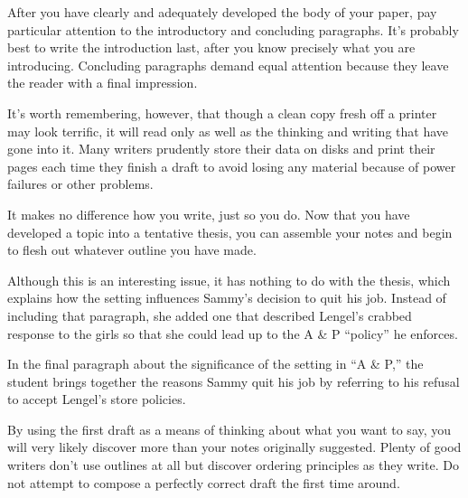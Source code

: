 \qquad [B] After you have clearly and adequately developed the body of your paper, pay particular attention to the introductory and concluding paragraphs. It’s probably best to write the introduction last, after you know precisely what you are introducing. Concluding paragraphs demand equal attention because they leave the reader with a final impression.

\qquad [C] It’s worth remembering, however, that though a clean copy fresh off a printer may look terrific, it will read only as well as the thinking and writing that have gone into it. Many writers prudently store their data on disks and print their pages each time they finish a draft to avoid losing any material because of power failures or other problems.

\qquad [D] It makes no difference how you write, just so you do. Now that you have developed a topic into a tentative thesis, you can assemble your notes and begin to flesh out whatever outline you have made.

\qquad [E] Although this is an interesting issue, it has nothing to do with the thesis, which explains how the setting influences Sammy’s decision to quit his job. Instead of including that paragraph, she added one that described Lengel’s crabbed response to the girls so that she could lead up to the A \& P “policy” he enforces.

\qquad [F] In the final paragraph about the significance of the setting in “A \& P,” the student brings together the reasons Sammy quit his job by referring to his refusal to accept Lengel’s store policies.

\qquad [G] By using the first draft as a means of thinking about what you want to say, you will very likely discover more than your notes originally suggested. Plenty of good writers don’t use outlines at all but discover ordering principles as they write. Do not attempt to compose a perfectly correct draft the first time around.